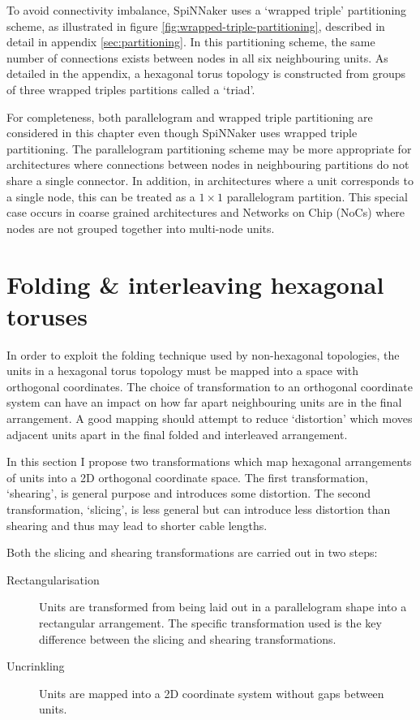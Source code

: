 		To avoid connectivity imbalance, SpiNNaker uses a `wrapped triple'
		partitioning scheme, as illustrated in figure
		\ref{fig:wrapped-triple-partitioning}, described in detail in appendix
		\ref{sec:partitioning}. In this partitioning scheme, the same number of
		connections exists between nodes in all six neighbouring units. As detailed
		in the appendix, a hexagonal torus topology is constructed from groups of
		three wrapped triples partitions called a `triad'.
		
		For completeness, both parallelogram and wrapped triple partitioning are
		considered in this chapter even though SpiNNaker uses wrapped triple
		partitioning. The parallelogram partitioning scheme may be more appropriate
		for architectures where connections between nodes in neighbouring
		partitions do not share a single connector. In addition, in architectures
		where a unit corresponds to a single node, this can be treated as a $1
		\times 1$ parallelogram partition.  This special case occurs in coarse
		grained architectures and Networks on Chip (NoCs) where nodes are not
		grouped together into multi-node units.
	
	\section{Folding \& interleaving hexagonal toruses}
		
		In order to exploit the folding technique used by non-hexagonal topologies,
		the units in a hexagonal torus topology must be mapped into a space with
		orthogonal coordinates. The choice of transformation to an orthogonal
		coordinate system can have an impact on how far apart neighbouring units
		are in the final arrangement. A good mapping should attempt to reduce
		`distortion' which moves adjacent units apart in the final folded and
		interleaved arrangement.
		
		In this section I propose two transformations which map hexagonal
		arrangements of units into a 2D orthogonal coordinate space. The first
		transformation, `shearing', is general purpose and introduces some
		distortion. The second transformation, `slicing', is less general but can
		introduce less distortion than shearing and thus may lead to shorter cable
		lengths.
		
		Both the slicing and shearing transformations are carried out in two steps:
		
		\begin{description}
			
			\item[Rectangularisation] Units are transformed from being laid out in a
			parallelogram shape into a rectangular arrangement. The specific
			transformation used is the key difference between the slicing and
			shearing transformations.
			
			\item[Uncrinkling] Units are mapped into a 2D coordinate system without
			gaps between units.
			
		\end{description}
		
